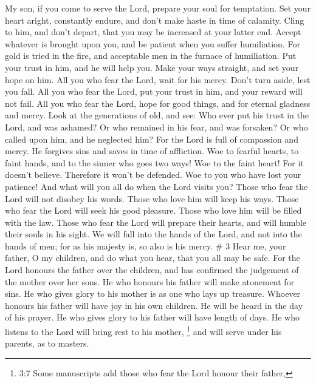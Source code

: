 My son, if you come to serve the Lord, prepare your soul
for temptation.  Set your heart aright, constantly endure,
and don't make haste in time of calamity.  Cling to him, and
don't depart, that you may be increased at your latter end. 
Accept whatever is brought upon you, and be patient when you suffer
humiliation.  For gold is tried in the fire, and acceptable
men in the furnace of humiliation.  Put your trust in him,
and he will help you. Make your ways straight, and set your hope on him.
 All you who fear the Lord, wait for his mercy. Don't turn
aside, lest you fall.  All you who fear the Lord, put your
trust in him, and your reward will not fail.  All you who
fear the Lord, hope for good things, and for eternal gladness and mercy.
 Look at the generations of old, and see: Who ever put his
trust in the Lord, and was ashamed? Or who remained in his fear, and was
forsaken? Or who called upon him, and he neglected him? 
For the Lord is full of compassion and mercy. He forgives sins and saves
in time of affliction.  Woe to fearful hearts, to faint
hands, and to the sinner who goes two ways!  Woe to the
faint heart! For it doesn't believe. Therefore it won't be defended.
 Woe to you who have lost your patience! And what will you
all do when the Lord visits you?  Those who fear the Lord
will not disobey his words. Those who love him will keep his ways.
 Those who fear the Lord will seek his good pleasure. Those
who love him will be filled with the law.  Those who fear
the Lord will prepare their hearts, and will humble their souls in his
sight.  We will fall into the hands of the Lord, and not
into the hands of men; for as his majesty is, so also is his mercy. \# 3
 Hear me, your father, O my children, and do what you hear,
that you all may be safe.  For the Lord honours the father
over the children, and has confirmed the judgement of the mother over
her sons.  He who honours his father will make atonement for
sins.  He who gives glory to his mother is as one who lays
up treasure.  Whoever honours his father will have joy in
his own children. He will be heard in the day of his prayer.
 He who gives glory to his father will have length of days.
He who listens to the Lord will bring rest to his mother, 
\footnote{3:7 Some manuscripts add those who fear the Lord honour their
  father,} and will serve under his parents, as to masters. 
